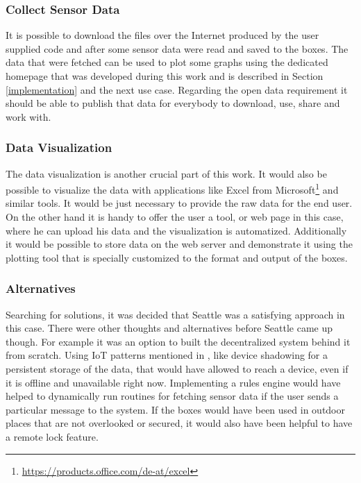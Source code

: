 \documentclass[bachelorthesis, grey, english]{mas-thesis-chapters} %
\begin{document}
\subsubsection{Collect Sensor Data}

It is possible to download the files over the Internet produced by the user supplied code and after some sensor data were read and saved to the boxes. The data that were fetched can be used to plot some graphs using the dedicated homepage that was developed during this work and is described in Section \ref{implementation} and the next use case. Regarding the open data requirement it should be able to publish that data for everybody to download, use, share and work with.

\subsubsection{Data Visualization}

The data visualization is another crucial part of this work. It would also be possible to visualize the data with applications like Excel from Microsoft\footnote{\url{https://products.office.com/de-at/excel}} and similar tools. It would be just necessary to provide the raw data for the end user. On the other hand it is handy to offer the user a tool, or web page in this case, where he can upload his data and the visualization is automatized. Additionally it would be possible to store data on the web server and demonstrate it using the plotting tool that is specially customized to the format and output of the boxes. 

\subsubsection{Alternatives}

Searching for solutions, it was decided that Seattle was a satisfying approach in this case. There were other thoughts and alternatives before Seattle came up though. For example it was an option to built the decentralized system behind it from scratch. Using \gls{IoT} patterns mentioned in \cite{iotPatterns}, like device shadowing for a persistent storage of the data, that would have allowed to reach a device, even if it is offline and unavailable right now. Implementing a rules engine would have helped to dynamically run routines for fetching sensor data if the user sends a particular message to the system. If the boxes would have been used in outdoor places that are not overlooked or secured, it would also have been helpful to have a remote lock feature.
\end{document}
